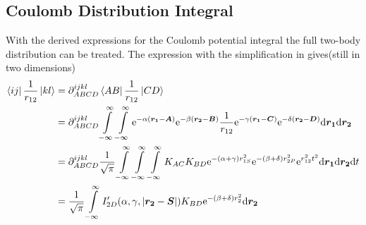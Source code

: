 \subsection{Coulomb Distribution Integral}
    With the derived expressions for the Coulomb potential integral the full
    two-body distribution can be treated. The expression with the
    simplification in  gives(still in two dimensions)
        \begin{align}
            \bra{ij}\frac{1}{r_{12}}\ket{kl} &= \mathrm{\partial}^{ijkl}_{ABCD}
            \bra{AB}\frac{1}{r_{12}}\ket{CD} \nonumber \\
            &= \mathrm{\partial}^{ijkl}_{ABCD} \int\limits^{\infty}_{-\infty}\int\limits^{\infty}_{-\infty}
            \mathrm{e}^{-\alpha(\boldsymbol{{r_1}}-\boldsymbol{{A}})}
            \mathrm{e}^{-\beta(\boldsymbol{{r_2}}-\boldsymbol{{B}})} \frac{1}{r_{12}}
            \mathrm{e}^{-\gamma(\boldsymbol{{r_1}}-\boldsymbol{{C}})}
            \mathrm{e}^{-\delta(\boldsymbol{{r_2}}-\boldsymbol{{D}})} \mathrm{d}\boldsymbol{{r_1}}\mathrm{d}\boldsymbol{{r_2}}
            \nonumber \\
            &= \mathrm{\partial}^{ijkl}_{ABCD} \frac{1}{\sqrt{\pi}}\int\limits^{\infty}_{-\infty}\int\limits^{\infty}_{-\infty}\int\limits^{\infty}_{-\infty}
            K_{AC}K_{BD}
            \mathrm{e}^{-(\alpha+\gamma)r^2_{1S}}\mathrm{e}^{-(\beta+\delta)r^2_{2P}}
            \mathrm{e}^{r^2_{12}t^2} \mathrm{d}\boldsymbol{{r_1}}\mathrm{d}\boldsymbol{{r_2}} \mathrm{d} t \nonumber \\
            &= \frac{1}{\sqrt{\pi}} \int\limits^{\infty}_{-\infty}
            I'_{2D}(\alpha,\gamma,\abs{\boldsymbol{{r_2}}- \boldsymbol{{S}}}) K_{BD}
            \mathrm{e}^{-(\beta + \delta)r^2_2} \mathrm{d}\boldsymbol{{r_2}} \nonumber \\
        \end{align}
